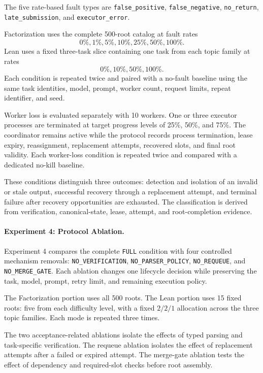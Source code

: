 \documentclass{article}
\theoremstyle{plain}
\begin{document}
The five rate-based fault types are
\texttt{false\_positive}, \texttt{false\_negative},
\texttt{no\_return}, \texttt{late\_submission}, and
\texttt{executor\_error}.

Factorization uses the complete 500-root catalog at fault rates
\[
0\%,1\%,5\%,10\%,25\%,50\%,100\%.
\]
Lean uses a fixed three-task slice containing one task from each topic
family at rates
\[
0\%,10\%,50\%,100\%.
\]
Each condition is repeated twice and paired with a no-fault baseline using
the same task identities, model, prompt, worker count, request limits,
repeat identifier, and seed.

Worker loss is evaluated separately with 10 workers. One or three executor
processes are terminated at target progress levels of 25\%, 50\%, and
75\%. The coordinator remains active while the protocol records process
termination, lease expiry, reassignment, replacement attempts, recovered
slots, and final root validity. Each worker-loss condition is repeated
twice and compared with a dedicated no-kill baseline.

These conditions distinguish three outcomes: detection and isolation of an
invalid or stale output, successful recovery through a replacement attempt,
and terminal failure after recovery opportunities are exhausted. The
classification is derived from verification, canonical-state, lease,
attempt, and root-completion evidence.


\paragraph{Experiment 4: Protocol Ablation.}

Experiment 4 compares the complete \texttt{FULL} condition with four
controlled mechanism removals:
\texttt{NO\_VERIFICATION}, \texttt{NO\_PARSER\_POLICY},
\texttt{NO\_REQUEUE}, and \texttt{NO\_MERGE\_GATE}.
Each ablation changes one lifecycle decision while preserving the task,
model, prompt, retry limit, and remaining execution policy.

The Factorization portion uses all 500 roots. The Lean portion uses
15 fixed roots: five from each difficulty level, with a fixed
\(2/2/1\) allocation across the three topic families. Each mode is
repeated three times.

The two acceptance-related ablations isolate the effects of typed parsing
and task-specific verification. The requeue ablation isolates the effect
of replacement attempts after a failed or expired attempt. The merge-gate
ablation tests the effect of dependency and required-slot checks before
root assembly.
\end{document}
